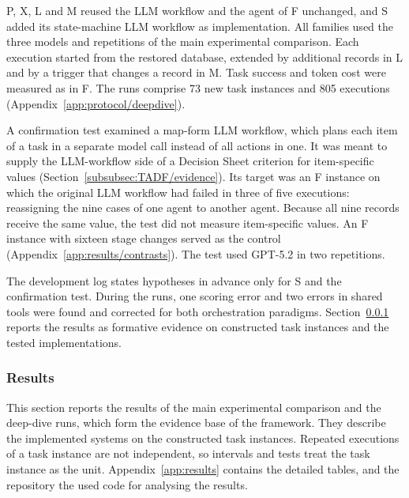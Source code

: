 P, X, L and M reused the LLM workflow and the agent of F unchanged, and S added its state-machine LLM workflow as implementation. All families used the three models and repetitions of the main experimental comparison. Each execution started from the restored database, extended by additional records in L and by a trigger that changes a record in M. Task success and token cost were measured as in F. The runs comprise 73 new task instances and 805 executions (Appendix~\ref{app:protocol/deepdive}).

A confirmation test examined a map-form LLM workflow, which plans each item of a task in a separate model call instead of all actions in one. It was meant to supply the LLM-workflow side of a Decision Sheet criterion for item-specific values (Section~\ref{subsubsec:TADF/evidence}). Its target was an F instance on which the original LLM workflow had failed in three of five executions: reassigning the nine cases of one agent to another agent. Because all nine records receive the same value, the test did not measure item-specific values. An F instance with sixteen stage changes served as the control (Appendix~\ref{app:results/contrasts}). The test used GPT-5.2 in two repetitions.

The development log states hypotheses in advance only for S and the confirmation test. During the runs, one scoring error and two errors in shared tools were found and corrected for both orchestration paradigms. Section~\ref{subsubsec:TADF/results} reports the results as formative evidence on constructed task instances and the tested implementations.

\subsubsection{Results}
\label{subsubsec:TADF/results}
This section reports the results of the main experimental comparison and the deep-dive runs, which form the evidence base of the framework. They describe the implemented systems on the constructed task instances. Repeated executions of a task instance are not independent, so intervals and tests treat the task instance as the unit. Appendix~\ref{app:results} contains the detailed tables, and the repository the used code for analysing the results. 

